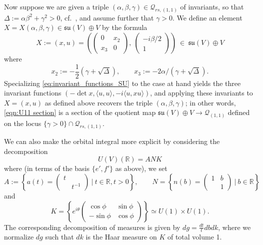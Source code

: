 \documentclass[reqno, 11pt]{amsart} %
\numberwithin{equation}{section}
\theoremstyle{plain}
\theoremstyle{definition}
\theoremstyle{remark}
\newcommand{\calQ}{\mathcal Q}
\newcommand{\lie}[1]{ \mathfrak{#1}}
\begin{document}
Now suppose we are given a triple $(\alpha, \beta, \gamma) \in \calQ_{rs, (1,1)}$ of invariants, so that$\Delta := \alpha\beta^2 + \gamma^2>0$, cf.\ , and assume further that $\gamma>0$. We define an element $X = X(\alpha,\beta,\gamma) \in \lie{su}(V) \oplus V$ by the formula
\begin{equation} \label{eqn:U11 section}
X :=  (x,u) = \left(\begin{pmatrix} 0 & x_2 \\ x_3 & 0 \end{pmatrix} , \  \begin{pmatrix} -i \beta / 2  \\ 1 \end{pmatrix} \right) \ \in \ \lie{su}(V) \oplus  V
\end{equation}
where
\begin{equation} \label{eqn:x2 x3 def}
x_2 :=  - \frac12 (\gamma + \sqrt{\Delta}), \qquad  x_3 := -2 \alpha/( \gamma + \sqrt{\Delta}).
\end{equation}
Specializing \eqref{eq:invariant_functions_SU} to the case at hand yields the three invariant functions $\left( - \det x, \langle u, u \rangle, -i \langle u, xu \rangle \right)$, and applying these invariants to $X = (x,u)$ as defined above recovers the triple $(\alpha,\beta,\gamma)$; in other words, \eqref{eqn:U11 section} is a section of the quotient map $\lie{su}(V) \oplus V \to \mathcal Q_{(1,1)}$ defined on the locus $\{ \gamma >0 \} \cap \calQ_{rs,(1,1)}$.

We can also make the orbital integral more explicit by considering the decomposition
\[
U(V)(\mathbb R) = A N K
\]
where (in terms of the basis $\{ e', f'\}$ as above), we set
\[
A := \left\{ a(t) =\begin{pmatrix}t & \\ & t^{-1} \end{pmatrix} \ | \ t \in \mathbb R, t>0 \right\}, \qquad N = \left\{ n(b) = \begin{pmatrix} 1 & b \\ & 1 \end{pmatrix} \ | \ b \in \mathbb R \right\}
\]
and
\[ K = \left\{  e^{i \theta} \begin{pmatrix}  \cos \phi & \sin \phi \\ - \sin \phi & \cos \phi \end{pmatrix}  \right\} \simeq U(1) \times U(1).	\]
The corresponding decomposition of measures is given by $dg = \frac{dt}t db dk$, where we normalize $dg$ such that $dk$ is the Haar measure on $K$ of total volume 1.
\end{document}
